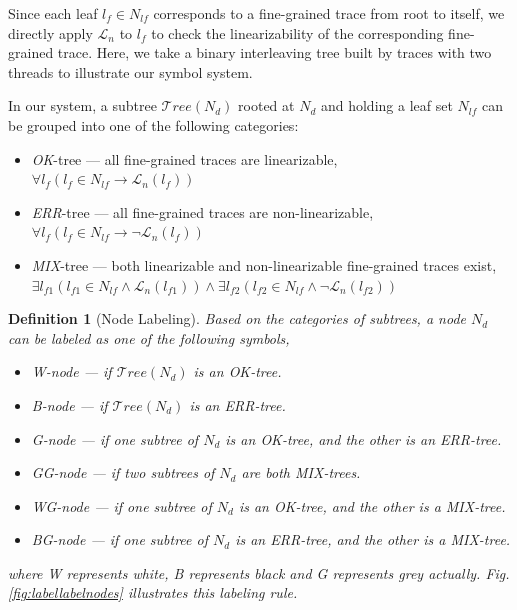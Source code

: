 \documentclass[runningheads]{llncs}
\newtheorem{myDef}{Definition}
\begin{document}
Since each leaf $l_f\in N_{lf}$ corresponds to a fine-grained trace from root to itself, we directly apply $\mathcal{L}_n$ to $l_f$ to check the linearizability of the corresponding fine-grained trace. Here, we take a binary interleaving tree built by traces with two threads to illustrate our symbol system.



In our system, a subtree $\mathcal{T}ree(N_{d})$ rooted at $N_d$ and holding a leaf set $N_{lf}$ can be grouped into one of the following categories:
\begin{itemize}
  \item \textit{OK}-tree --- all fine-grained traces are linearizable,\\
  $\forall l_f \left( l_f\in N_{lf} \rightarrow \mathcal{L}_n(l_f)\right)$
  \item \textit{ERR}-tree --- all fine-grained traces are non-linearizable,\\
  $\forall l_f \left(  l_f\in N_{lf} \rightarrow \neg \mathcal{L}_n(l_f)\right)$
  \item \textit{MIX}-tree --- both linearizable and non-linearizable fine-grained traces exist,\\
  $\exists l_{f1} ( l_{f1}\in N_{lf} \wedge \mathcal{L}_n(l_{f1})) \wedge  \exists l_{f2} (l_{f2}\in N_{lf} \wedge \neg \mathcal{L}_n(l_{f2}))$

\end{itemize}





\begin{myDef}[Node Labeling]\label{def:nodelabel}
Based on the categories of subtrees, a node $N_d$ can be labeled as one of the following symbols,
\begin{itemize}
  \item \textit{W}-node --- if $\mathcal{T}ree(N_d)$ is an \textit{OK}-tree.
  \item \textit{B}-node --- if $\mathcal{T}ree(N_d)$ is an \textit{ERR}-tree.
  \item \textit{G}-node --- if one subtree of $N_d$ is an \textit{OK}-tree, and the other is an \textit{ERR}-tree.
  \item \textit{GG}-node --- if two subtrees of $N_d$ are both \textit{MIX}-trees.
  \item \textit{WG}-node --- if one subtree of $N_d$ is an \textit{OK}-tree, and the other is a \textit{MIX}-tree.
  \item \textit{BG}-node --- if one subtree of $N_d$ is an \textit{ERR}-tree, and the other is a \textit{MIX}-tree.
\end{itemize}
\noindent where \textit{W} represents \textit{white}, \textit{B} represents \textit{black} and \textit{G} represents \textit{grey} actually. Fig. \ref{fig:labellabelnodes} illustrates this labeling rule.
\end{myDef}
\end{document}
